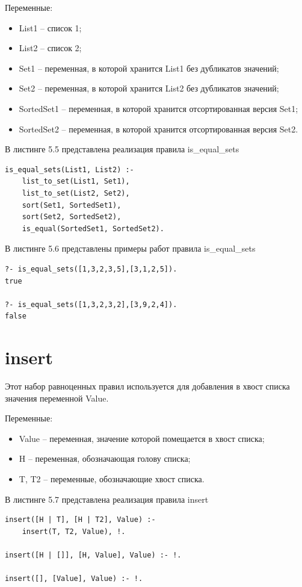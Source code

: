 \documentclass[12pt]{report}
\begin{document}
Переменные:
\begin{itemize}
\item List1 – список 1;
\item List2 – список 2;
\item Set1 – переменная, в которой хранится List1 без дубликатов значений;
\item Set2 – переменная, в которой хранится List2 без дубликатов значений;
\item SortedSet1 – переменная, в которой хранится отсортированная версия Set1;
\item SortedSet2 – переменная, в которой хранится отсортированная версия Set2.
\end{itemize}

В листинге 5.5 представлена реализация правила is\_equal\_sets

\begin{lstlisting}[label=some-code, caption=реализация правила is\_equal\_sets]
is_equal_sets(List1, List2) :-
	list_to_set(List1, Set1),
	list_to_set(List2, Set2),
	sort(Set1, SortedSet1),
	sort(Set2, SortedSet2),
	is_equal(SortedSet1, SortedSet2).
\end{lstlisting}
В листинге 5.6 представлены примеры работ правила is\_equal\_sets

\begin{lstlisting}[label=some-code, caption=примеры работ правила is\_equal\_sets]
?- is_equal_sets([1,3,2,3,5],[3,1,2,5]).
true

?- is_equal_sets([1,3,2,3,2],[3,9,2,4]).
false
\end{lstlisting}
\section{insert}
Этот набор равноценных правил используется для добавления в хвост списка значения переменной Value.

Переменные:
\begin{itemize}
\item Value – переменная, значение которой помещается в хвост списка;
\item H – переменная, обозначающая голову списка;
\item T, T2 – переменные, обозначающие хвост списка.
\end{itemize}

В листинге 5.7 представлена реализация правила insert

\begin{lstlisting}[label=some-code, caption=реализация правила insert]
insert([H | T], [H | T2], Value) :-
	insert(T, T2, Value), !.

insert([H | []], [H, Value], Value) :- !.

insert([], [Value], Value) :- !.
\end{lstlisting}
\end{document}
